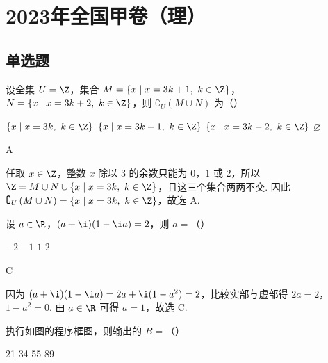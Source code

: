 \chapter{2023年全国甲卷（理）}

\section{单选题}

\begin{problem}
设全集 \( U=\Z \)，集合 \( M=\{x\mid x=3k+1,\ k\in \Z\} \)，\( N=\{x\mid x=3k+2,\ k\in \Z\} \)，则 \( \complement_U\left( M\cup N \right) \) 为（\quad）

\choices
    {\(\{x\mid x=3k,\ k\in \Z\}\)}
    {\(\{x\mid x=3k-1,\ k\in \Z\}\)}
    {\(\{x\mid x=3k-2,\ k\in \Z\}\)}
    {\(\varnothing\)}
\end{problem}

\begin{answer}
A
\end{answer}

\begin{solution}
任取 \(x\in\Z\)，整数 \(x\) 除以 \(3\) 的余数只能为 \(0\)，\(1\) 或 \(2\)，所以
\(\Z=M\cup N\cup\{x\mid x=3k,\ k\in\Z\}\)，且这三个集合两两不交. 因此
\(\complement_U\left(M\cup N\right)=\{x\mid x=3k,\ k\in\Z\}\)，故选 A.
\end{solution}

\begin{problem}
设 \( a\in \R \)，\( (a+\i)(1-\i a)=2 \)，则 \( a= \)（\quad）

\choices
    {\(-2\)}
    {\(-1\)}
    {\(1\)}
    {\(2\)}
\end{problem}

\begin{answer}
C
\end{answer}

\begin{solution}
因为
\((a+\i)(1-\i a)=2a+\i(1-a^2)=2\)，比较实部与虚部得
\(2a=2\)，\(1-a^2=0\). 由 \(a\in\R\) 可得 \(a=1\)，故选 C.
\end{solution}

\begin{problem}
执行如图的程序框图，则输出的 \( B= \)（\quad）


\choices
    {21}
    {34}
    {55}
    {89}
\end{problem}

